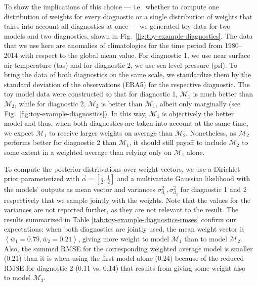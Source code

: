 To show the implications of this choice --- i.e.~whether to compute one distribution of weights for every diagnostic or a single distribution of weights that takes into account all diagnostics at once --- we generated toy data for two models and two diagnostics, shown in Fig.~\ref{fig:toy-example-diagnostics}.
The data that we use here are anomalies of climatologies for the time period from 1980--2014 with respect to the global mean value. For diagnostic 1, we use near surface air temperature (tas) and for diagnostic 2, we use sea level pressure (psl). To bring the data of both diagnostics on the same scale, we standardize them by the standard deviation of the observations (ERA5) for the respective diagnostic.
The toy model data were constructed so that for diagnostic 1, $\mathcal{M}_1$ is much better than $\mathcal{M}_2$, while for diagnostic 2, $\mathcal{M}_2$ is better than $\mathcal{M}_1$, albeit only marginally (see Fig.~\ref{fig:toy-example-diagnostics}).
In this way, $\mathcal{M}_1$ is objectively the better model and thus, when both diagnostics are taken into account at the same time, we expect $\mathcal{M}_1$ to receive larger weights on average than $\mathcal{M}_2$.
Nonetheless, as $\mathcal{M}_2$ performs better for diagnostic 2 than $\mathcal{M}_1$, it should still payoff to include $\mathcal{M}_2$ to some extent in a weighted average than relying only on $\mathcal{M}_1$ alone.

To compute the posterior distributions over weight vectors, we use a Dirichlet prior parameterized with $\vec{\alpha} = [\frac{1}{2}, \frac{1}{2}]$ and a multivariate Gaussian likelihood with the models' outputs as mean vector and variances $\sigma_{d_1}^2, \sigma_{d_2}^2$ for diagnostic 1 and 2 respectively that we sample jointly with the weights. Note that the values for the variances are not reported further, as they are not relevant to the result. 
The results summarized in Table \ref{tab:toy-example-diagnostics-rmses} confirm our expectations: when both diagnostics are jointly used, the mean weight vector is $\left<\bar{w}_1=0.79, \bar{w}_2=0.21\right>$, giving more weight to model $\mathcal{M}_1$ than to model $\mathcal{M}_2$. 
Also, the summed RMSE for the corresponding weighted average model is smaller (0.21) than it is when using the first model alone (0.24) because of the reduced RMSE for diagnostic 2 (0.11 vs. 0.14) that results from giving some weight also to model $\mathcal{M}_2$.

